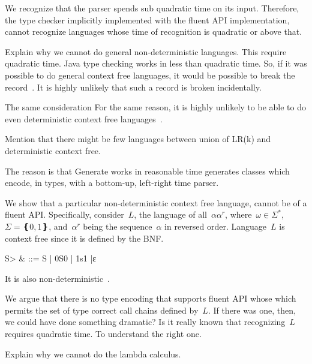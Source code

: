 We recognize that the \Java parser spends sub quadratic time
  on its input.
Therefore,
  the type checker implicitly implemented with the fluent API implementation,
  cannot recognize languages whose time of recognition is quadratic or above that.

Explain why we cannot do general non-deterministic languages. This require quadratic time.
Java type checking works in less than quadratic time. So, if it was possible to
do general context free languages, it would be possible to
  break the record~\cite{cubic time algorithms}.
It is highly unlikely that such a record is broken incidentally.

The same consideration
For the same reason, it is highly unlikely to be able to do even deterministic
context free languages~\cite{http://www.sciencedirect.com/science/article/pii/S0019995868910875}.

   Mention that there might be few languages between union of LR(k) and deterministic context free.

The reason is that Generate works in reasonable time \Self generates classes which encode, in types, with a bottom-up, left-right time parser.

We show that a particular non-deterministic context free language,
cannot be of a fluent API\@.
Specifically, consider~$L$, the language of all~$αα^r$, where~$\omega∈Σ^*$,~$Σ=❴0,1❵$,
and~$α^r$ being the sequence~$α$ in reversed order.
Language~$L$ is context free since it is defined by the BNF.
\begin{Grammar}
  \begin{aligned}
    \<S> & ::= S | 0S0 | 1s1 |ε
  \end{aligned}
\end{Grammar}
It is also non-deterministic~\cite{Hopcroft:2001}.

We argue that there is no type encoding that supports fluent API whose
  which permits the set of type correct call chains defined by~$L$.
If there was one, then, we could have done something dramatic?
Is it really known that recognizing~$L$ requires quadratic
  time.
To understand
 the right one.

Explain why we cannot do the lambda calculus.
